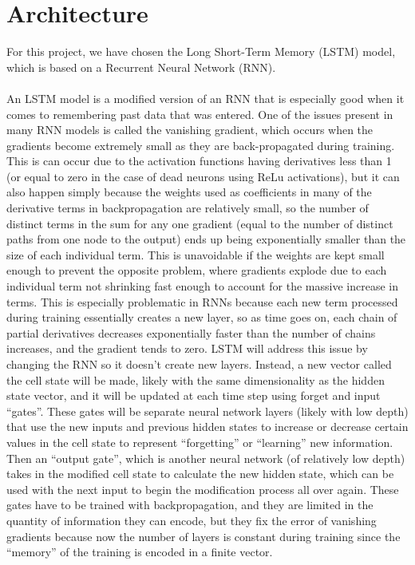 \documentclass{article} %
\begin{document}
\section{Architecture}
For this project, we have chosen the Long Short-Term Memory (LSTM) model, which is based on a Recurrent Neural Network (RNN).\\\\

An LSTM model is a modified version of an RNN that is especially good when it comes to remembering past data that was entered.
One of the issues present in many RNN models is called the vanishing gradient, which occurs when the gradients become extremely small as they are back-propagated during training.
This is can occur due to the activation functions having derivatives less than 1 (or equal to zero in the case of dead neurons using ReLu activations), 
but it can also happen simply because the weights used as coefficients in many of the derivative terms in backpropagation are relatively small, 
so the number of distinct terms in the sum for any one gradient (equal to the number of distinct paths from one node to the output) ends up being exponentially smaller than the size of each individual term.
This is unavoidable if the weights are kept small enough to prevent the opposite problem, where gradients explode due to each individual term not shrinking fast enough to account for the massive increase in terms.
This is especially problematic in RNNs because each new term processed during training essentially creates a new layer, so as time goes on, each chain of partial derivatives decreases exponentially faster than the number of chains increases, and the gradient tends to zero.
LSTM will address this issue by changing the RNN so it doesn’t create new layers.
Instead, a new vector called the cell state will be made, likely with the same dimensionality as the hidden state vector, 
and it will be updated at each time step using forget and input “gates”.
These gates will be separate neural network layers (likely with low depth) that use the new inputs and previous hidden states to increase or decrease certain values in the cell state to represent “forgetting” or “learning” new information.
Then an “output gate”, which is another neural network (of relatively low depth) takes in the modified cell state to calculate the new hidden state, which can be used with the next input to begin the modification process all over again.
These gates have to be trained with backpropagation, and they are limited in the quantity of information they can encode, but they fix the error of vanishing gradients because now the number of layers is constant during training since the “memory” of the training is encoded in a finite vector.\\\\
\end{document}
